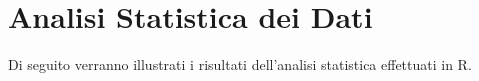 \chapter{Analisi Statistica dei Dati}
Di seguito verranno illustrati i risultati dell'analisi statistica effettuati in R.


